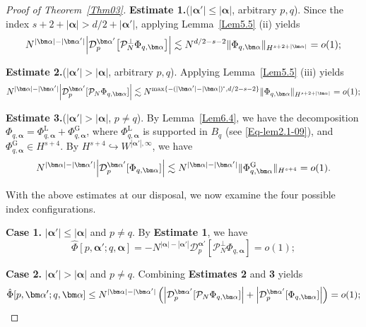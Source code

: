 \documentclass{sn-jnl}%
\newcommand{\m}{\textbf{-}}
\numberwithin{equation}{section}
\theoremstyle{thmstyleone}%
\theoremstyle{thmstyletwo}%
\theoremstyle{thmstylethree}%
\begin{document}
\begin{proof}[Proof of Theorem~\ref{Thm03}]
    \textbf{Estimate 1.}($|\bm \alpha'|\leq|\bm \alpha|$, arbitrary $p,q$).
    Since the index $s+2+|\bm \alpha| > d/2 + |\bm \alpha'|$, applying  Lemma~\ref{Lem5.5} (ii) yields
    \begin{equation}
       N^{|\bm \alpha|-|\bm \alpha'|}\Bigl| \mathcal{D}^{\bm \alpha'}_p\big[\mathcal{P}_N^\perp\Phi_{q,\bm \alpha}\big]\Bigr|\lesssim N^{d/2-s-2}\|\Phi_{q,\bm \alpha}\|_{H^{s+2+|\bm \alpha|}}=o(1);
    \end{equation}

    \textbf{Estimate 2.}($|\bm \alpha'| > |\bm \alpha|$, arbitrary $p,q$). Applying Lemma~\ref{Lem5.5}  (iii)  yields
    \begin{equation}\label{Eq-thm03-07}
    N^{|\bm \alpha|-|\bm \alpha'|}\Bigl|\mathcal{D}^{\bm \alpha'}_p[\mathcal{P}_N\Phi_{q,\bm \alpha}]\Bigr|\lesssim N^{\max\{-(|\bm \alpha'|-|\bm \alpha|)^{\m},d/2-s-2\}} \|\Phi_{q,\bm \alpha}\|_{H^{s+2+|\bm \alpha|}} =o(1);
    \end{equation}

    \textbf{Estimate 3.}($|\bm \alpha'| > |\bm \alpha|$, $p\neq q$). 
    By Lemma~\ref{Lem6.4}, we have the decomposition $\Phi_{q,\bm \alpha}=  \Phi_{q,\bm \alpha}^{\mathrm{L}}+ \Phi_{q,\bm \alpha}^{\mathrm{G}}$, where 
    $\Phi_{q,\bm \alpha}^{\mathrm{L}}$ is supported in $B_q$ (see \eqref{Eq-lem2.1-09}), and  $\Phi_{q,\bm \alpha}^{\mathrm{G}}\in H^{s+4}$. By $H^{s+4}\hookrightarrow W^{|\bm \alpha'|,\infty}$, we have 
    \begin{equation}\label{Eq-thm03-08}
    N^{|\bm \alpha|-|\bm \alpha'|}\Bigl|\mathcal{D}^{\bm \alpha'}_p[\Phi_{q,\bm \alpha}]\Bigr|\lesssim N^{|\bm \alpha|-|\bm \alpha'|}\|\Phi^{\mathrm{G}}_{q,\bm \alpha}\|_{H^{s+4}}= o(1).
    \end{equation}
    

    With the above estimates at our disposal, we now examine the four possible index configurations.
    
    \textbf{Case 1.} $|\bm \alpha'| \le |\bm \alpha|$ and $p\neq q$. By  \textbf{Estimate 1}, we have
    \[
        \hat\Phi[p,\bm \alpha';q,\bm \alpha]=  -N^{|\bm \alpha|-|\bm \alpha'|}\mathcal{D}^{\bm \alpha'}_p[\mathcal{P}^{\perp}_N\Phi_{q,\bm \alpha}] = o(1);
    \]
    
    \textbf{Case 2.} $|\bm \alpha'| > |\bm \alpha|$ and $p\neq q$. Combining  \textbf{Estimates 2} and \textbf{3} yields
    \[
        \hat\Phi[p,\bm \alpha';q,\bm \alpha]\leq  N^{|\bm \alpha|-|\bm \alpha'|}\left(\Bigl|\mathcal{D}^{\bm \alpha'}_p[\mathcal{P}_N\Phi_{q,\bm \alpha}]\Bigr|+\Bigl|\mathcal{D}^{\bm \alpha'}_p[\Phi_{q,\bm \alpha}]\Bigr|\right) = o(1);
    \]
    

\end{proof}
\end{document}
